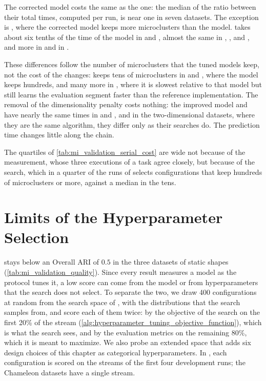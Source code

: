 

The corrected model costs the same as the  one: the median of the ratio between their total times, computed per run, is near one in seven datasets. The exception is , where the corrected model keeps more microclusters than the  model. \MicroTEDAClusPlus takes about six tenths of the time of the  model in \ChameleonDSThree and \ChameleonDSFour, almost the same in \BenchmarkTwo, \Cassini,  and , and more in \RandomRBFGeneratorEvents and in \BenchmarkOne.

These differences follow the number of microclusters that the tuned models keep, not the cost of the changes: \MicroTEDAClusPlus keeps tens of microclusters in \ChameleonDSThree and \ChameleonDSFour, where the  model keeps hundreds, and many more in \BenchmarkOne, where it is slowest relative to that model but still learns the evaluation segment faster than the reference implementation. The removal of the dimensionality penalty costs nothing: the improved model and \MicroTEDAClusPlus have nearly the same times in  and , and in the two-dimensional datasets, where they are the same algorithm, they differ only as their searches do. The prediction time changes little along the chain.

The quartiles of \cref{tab:mi_validation_serial_cost} are wide not because of the measurement, whose three executions of a task agree closely, but because of the search, which in a quarter of the runs of \ChameleonDSFour selects configurations that keep hundreds of microclusters or more, against a median in the tens.

\section{Limits of the Hyperparameter Selection}
\label{sec:mi_selection}

\MicroTEDAClusPlus stays below an Overall ARI of $0.5$ in the three datasets of static shapes (\cref{tab:mi_validation_quality}). Since every result measures a model as the protocol tunes it, a low score can come from the model or from hyperparameters that the search does not select. To separate the two, we draw 400 configurations at random from the search space of \MicroTEDAClusPlus, with the distributions that the search samples from, and score each of them twice: by the objective of the search on the first 20\% of the stream (\cref{alg:hyperparameter_tuning_objective_function}), which is what the search sees, and by the evaluation metrics on the remaining 80\%, which it is meant to maximize. We also probe an extended space that adds six design choices of this chapter as categorical hyperparameters. In \Cassini, each configuration is scored on the streams of the first four development runs; the Chameleon datasets have a single stream.

